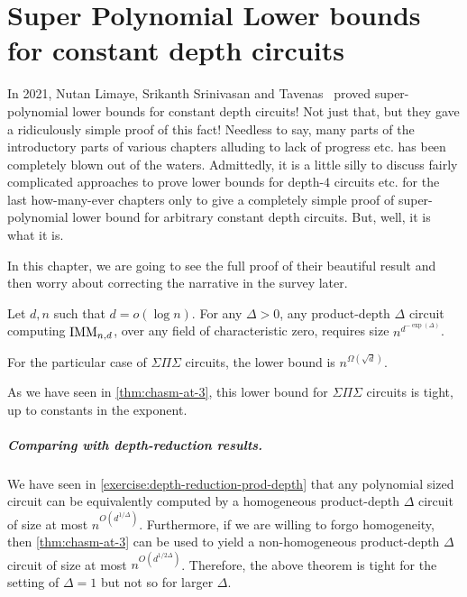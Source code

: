 \chapter{Super Polynomial Lower bounds for constant depth circuits}

In 2021, Nutan Limaye, Srikanth Srinivasan and \Sebastien Tavenas~\cite{LST21} proved super-polynomial lower bounds for constant depth circuits! Not just that, but they gave a ridiculously simple proof of this fact! Needless to say, many parts of the introductory parts of various chapters alluding to lack of progress etc. has been completely blown out of the waters. Admittedly, it is a little silly to discuss fairly complicated approaches to prove lower bounds for depth-$4$ circuits etc. for the last how-many-ever chapters only to give a completely simple proof of super-polynomial lower bound for arbitrary constant depth circuits. But, well, it is what it is. 

In this chapter, we are going to see the full proof of their beautiful result and then worry about correcting the narrative in the survey later. 

\begin{theorem} Let $d,n$ such that $d = o(\log n)$. For any $\Delta > 0$, any product-depth $\Delta$ circuit computing $\operatorname{\mathrm{IMM}}_{n,d}$, over any field of characteristic zero, requires size $n^{d^{-\exp(\Delta)}}$.

  For the particular case of $\Sigma\Pi\Sigma$ circuits, the lower bound is $n^{\Omega(\sqrt{d})}$. 
\end{theorem}

As we have seen in \autoref{thm:chasm-at-3}, this lower bound for $\Sigma\Pi\Sigma$ circuits is tight, up to constants in the exponent.

\paragraph{Comparing with depth-reduction results.} We have seen in \autoref{exercise:depth-reduction-prod-depth} that any polynomial sized circuit can be equivalently computed by a homogeneous product-depth $\Delta$ circuit of size at most $n^{O(d^{1/\Delta})}$. Furthermore, if we are willing to forgo homogeneity, then \autoref{thm:chasm-at-3} can be used to yield a non-homogeneous product-depth $\Delta$ circuit of size at most $n^{O(d^{1/2\Delta})}$. Therefore, the above theorem is tight for the setting of $\Delta = 1$ but not so for larger $\Delta$.

